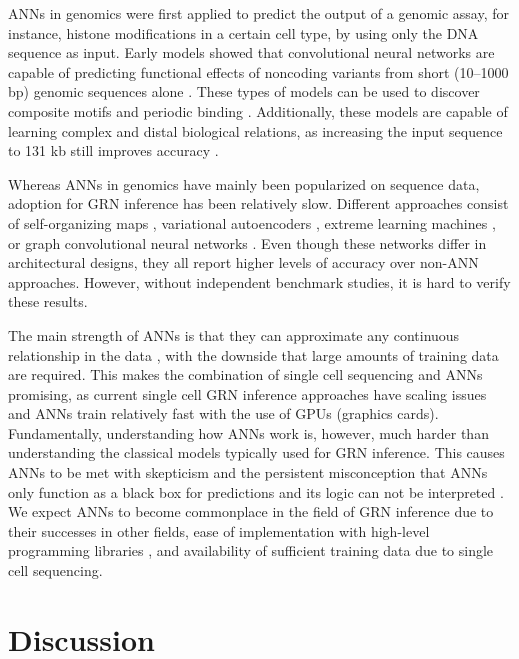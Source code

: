 ANNs in genomics were first applied to predict the output of a genomic assay, for instance, histone modifications in a certain cell type, by using only the DNA sequence as input. Early models showed that convolutional neural networks are capable of predicting functional effects of noncoding variants from short (10–1000 bp) genomic sequences alone \cite{Alipanahi_2015,Zhou_2015}. These types of models can be used to discover composite motifs and periodic binding \cite{Avsec_2021}. Additionally, these models are capable of learning complex and distal biological relations, as increasing the input sequence to 131 kb still improves accuracy \cite{Kelley_2018}.

Whereas ANNs in genomics have mainly been popularized on sequence data, adoption for GRN inference has been relatively slow. Different approaches consist of self-organizing maps \cite{Jansen_2019}, variational autoencoders \cite{Shu_2021}, extreme learning machines \cite{Rubiolo_2017}, or graph convolutional neural networks \cite{https://doi.org/10.48550/arxiv.1806.06975,Wang_2020}. Even though these networks differ in architectural designs, they all report higher levels of accuracy over non-ANN approaches. However, without independent benchmark studies, it is hard to verify these results.

The main strength of ANNs is that they can approximate any continuous relationship in the data \cite{Cybenko_1989,Hornik_1989}, with the downside that large amounts of training data are required. This makes the combination of single cell sequencing and ANNs promising, as current single cell GRN inference approaches have scaling issues \cite{McCalla_2021} and ANNs train relatively fast with the use of GPUs (graphics cards). Fundamentally, understanding how ANNs work is, however, much harder than understanding the classical models typically used for GRN inference. This causes ANNs to be met with skepticism and the persistent misconception that ANNs only function as a black box for predictions and its logic can not be interpreted \cite{Zhang_2021}. We expect ANNs to become commonplace in the field of GRN inference due to their successes in other fields, ease of implementation with high-level programming libraries \cite{chollet2015keras,https://doi.org/10.48550/arxiv.1912.01703}, and availability of sufficient training data due to single cell sequencing.

\section{Discussion}

